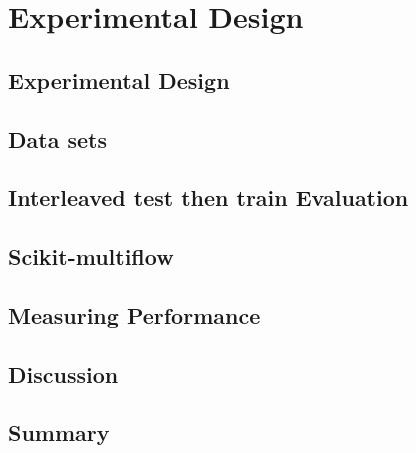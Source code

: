 
\chapter{Experimental Design} %

\label{Chapter4} %


\section{Experimental Design}

\section{Data sets}

\section{Interleaved test then train Evaluation}

\section{Scikit-multiflow}
\cite{skmultiflow}

\section{Measuring Performance}

\section{Discussion}

\section{Summary}